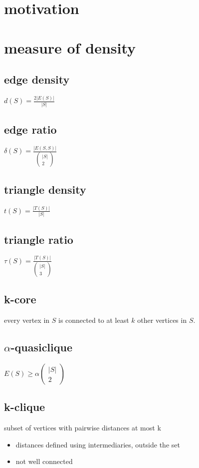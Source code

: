 \documentclass[11pt]{article}
\author{陈小羽}
\date{\today}
\title{}
\begin{document}
\tableofcontents

\section{motivation}
\label{sec:org4d8f60c}
\section{measure of density}
\label{sec:orgac8d646}
\subsection{edge density}
\label{sec:orgc230dc3}
\(d(S) = \frac{2|E(S)|}{|S|}\)
\subsection{edge ratio}
\label{sec:orgda19fb3}
\(\delta(S) = \frac{|E(S, S)|}{\left(\begin{array}{c} |S| \\ 2 \end{array}\right)}\)
\subsection{triangle density}
\label{sec:orga5ed7f5}
\(t(S) = \frac{|T(S)|}{|S|}\)
\subsection{triangle ratio}
\label{sec:orgaa34820}
\(\tau(S) = \frac{|T(S)|}{\left(\begin{array}{c} |S| \\ 3 \end{array}\right)}\)
\subsection{k-core}
\label{sec:orgb833e44}
every vertex in \(S\) is connected to at least \(k\) other vertices in \(S\).
\subsection{\(\alpha\)-quasiclique}
\label{sec:org3d5fa9d}
\(E(S) \geq \alpha\left(\begin{array}{c} |S| \\ 2\end{array}\right)\)
\subsection{k-clique}
\label{sec:org164ef76}
subset of vertices with pairwise distances at most k
\begin{itemize}
\item distances defined using intermediaries, outside the set
\item not well connected
\end{itemize}
\end{document}
